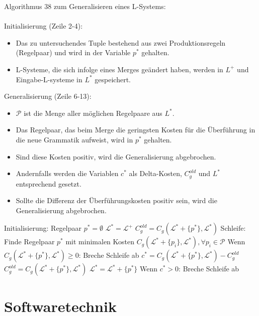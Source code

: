 Algorithmus 38 zum Generalisieren eines L-Systems:\\~\\
Initialisierung (Zeile 2-4):
\begin{itemize}
    \item Das zu untersuchendes Tuple bestehend aus zwei Produktionsregeln (Regelpaar) und wird in der Variable $p^*$ gehalten.
    \item L-Systeme, die sich infolge eines Merges geändert haben, werden in $L^+$ und Eingabe-L-systeme in $L^*$ gespeichert.
\end{itemize}
Generalisierung (Zeile 6-13):
\begin{itemize}
    \item $\mathcal{P}$ ist die Menge aller möglichen Regelpaare aus $L^*$.
    \item Das Regelpaar, das beim Merge die geringsten Kosten für die Überführung in die neue Grammatik aufweist, wird in
    $p^*$ gehalten.
    \item Sind diese Kosten positiv, wird die Generalisierung abgebrochen.
    \item Andernfalls werden die Variablen $c^*$ als Delta-Kosten, $C^{old}_g$ und $L^*$ entsprechend gesetzt.
    \item Sollte die Differenz der Überführungskosten positiv sein, wird die Generalisierung abgebrochen.
\end{itemize}

\begin{algorithm}[caption={Generalisieren eines L-Systems mit Gewichtung $w_0$}]
Initialisierung:
    Regelpaar $p^* = \emptyset$
    $\mathcal{L}^* = \mathcal{L}^+$
    $C_g^{old} = C_g(\mathcal{L}^* + \{p^*\}, \mathcal{L}^*)$
Schleife:
    Finde Regelpaar $p^*$ mit minimalen Kosten $C_g(\mathcal{L}^* + \{p_i\}, \mathcal{L}^*), \forall p_i \in \mathcal{P}$
    Wenn $C_g(\mathcal{L}^* + \{p^*\}, \mathcal{L}^*) \geq 0$:
        Breche Schleife ab
    $c^* = C_g(\mathcal{L}^* + \{p^*\}, \mathcal{L}^*) - C_g^{old}$
    $C_g^{old} = C_g(\mathcal{L}^* + \{p^*\}, \mathcal{L}^*)$
    $\mathcal{L}^* = \mathcal{L}^* + \{p^*\}$
    Wenn $c^* > 0$:
        Breche Schleife ab
\end{algorithm}

\newpage

\section{Softwaretechnik}

